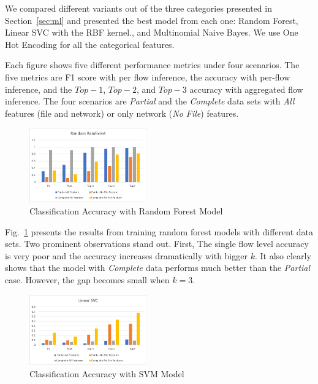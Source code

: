 We compared different variants out of the three categories presented in Section~\ref{sec:ml} and presented the best model from each one: Random Forest, Linear SVC with the RBF kernel., and Multinomial Naive Bayes.
We use One Hot Encoding for all the categorical features. 

Each figure shows five different performance metrics under four scenarios. The five metrics are F1 score with per flow inference, the accuracy with per-flow inference, and the $Top-1$, $Top-2$, and $Top-3$ accuracy with
aggregated flow inference. The four scenarios are {\it Partial} and the {\it Complete} data sets with {\it All} features (file and network) or only network ({\it No File}) features.

\begin{figure}[!ht]
\begin{center}
\includegraphics[width=0.45\textwidth]{./figure/rf-accuracy}
\end{center}
\vspace{-0.05in}
\caption{Classification Accuracy with Random Forest Model}
\vspace{-0.05in}
\label{fig:dt}
\end{figure}

Fig.~\ref{fig:dt} presents the results from training random forest models with different data sets. Two prominent observations stand out. First,   
The single flow level accuracy is very poor and the accuracy increases dramatically with bigger $k$. It also clearly shows that the model with {\it Complete} data performs much better than the {\it Partial} case. However, the gap becomes small when $k=3$. 

\begin{figure}[!ht]
\begin{center}
\includegraphics[width=0.45\textwidth]{./figure/svc-accuracy}
\end{center}
\vspace{-0.05in}
\caption{Classification Accuracy with SVM Model}
\vspace{-0.05in}
\label{fig:svm}
\end{figure}

